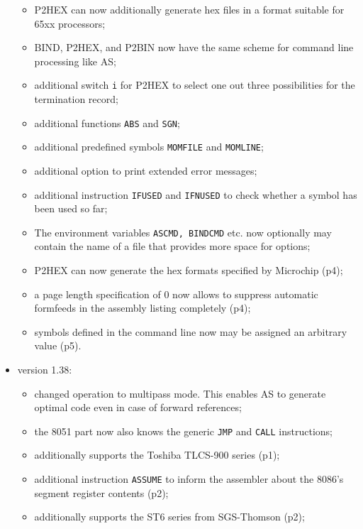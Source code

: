 \documentclass[12pt,twoside]{report}
\newcommand{\tty}[1]{{\tt #1}}
\begin{document}
\begin{itemize}
{\begin{itemize}
{            argument;}
      \item{P2HEX can now additionally generate hex files in
            a format suitable for 65xx processors;}
      \item{BIND, P2HEX, and P2BIN now have the same scheme
            for command line processing like AS;}
      \item{additional switch \tty{i} for P2HEX to select one out
            three possibilities for the termination record;}
      \item{additional functions \tty{ABS} and \tty{SGN};}
      \item{additional predefined symbols \tty{MOMFILE} and \tty{MOMLINE};}
      \item{additional option to print extended error messages;}
      \item{additional instruction \tty{IFUSED} and \tty{IFNUSED} to check
            whether a symbol has been used so far;}
      \item{The environment variables \tty{ASCMD, BINDCMD} etc. now
            optionally may contain the name of a file that
            provides more space for options;}
      \item{P2HEX can now generate the hex formats specified
            by Microchip (p4);}
      \item{a page length specification of 0 now allows to
            suppress automatic formfeeds in the assembly listing
            completely (p4);}
      \item{symbols defined in the command line now may be
            assigned an arbitrary value (p5).}
      \end{itemize}}
\item{version 1.38:
      \begin{itemize}
      \item{changed operation to multipass mode.  This enables
            AS to generate optimal code even in case of forward
            references;}
      \item{the 8051 part now also knows the generic \tty{JMP} and
            \tty{CALL} instructions;}
      \item{additionally supports the Toshiba TLCS-900 series
            (p1);}
      \item{additional instruction \tty{ASSUME} to inform the assembler
            about the 8086's segment register contents (p2);}
      \item{additionally supports the ST6 series from
            SGS-Thomson (p2);}

\end{itemize}}
\end{itemize}
\end{document}
